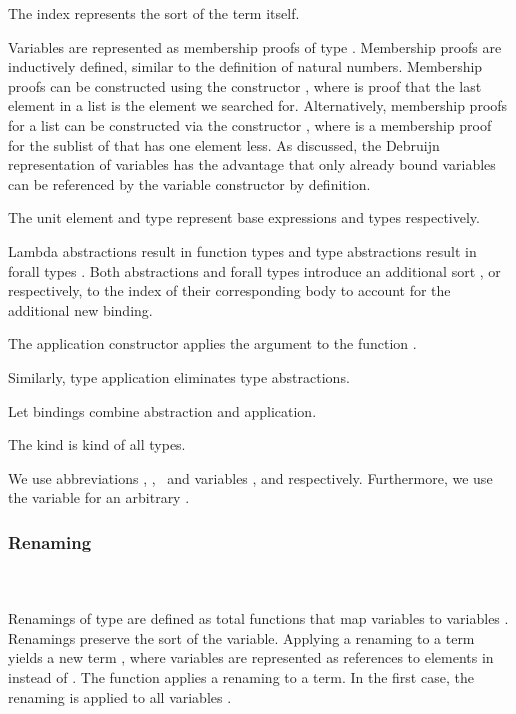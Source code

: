 \noindent The index  represents the sort of the term itself.

\FTerm
Variables   are represented as membership proofs of type   .
Membership proofs are inductively defined, similar to the definition of natural numbers. 
Membership proofs can be constructed using the constructor , where  is proof that the last element in a list  is the element we searched for. 
Alternatively, membership proofs for a list  can be constructed via the constructor  , where  is a membership proof for the sublist  of  that has one element less. 
As discussed, the Debruijn representation of variables has the advantage that only already bound variables can be referenced by the variable constructor by definition. 

\noindent The unit element  and type  represent base expressions and types respectively. 

\noindent Lambda abstractions   result in function types    and type abstractions   result in forall types  . 
Both abstractions and forall types introduce an additional sort , or  respectively, to the index  of their corresponding body to account for the additional new binding.

\noindent The application constructor    applies the argument  to the function .

\noindent Similarly, type application    eliminates type abstractions. 

\noindent Let bindings     combine abstraction and application. 

\noindent The kind  is kind of all types.

\noindent We use abbreviations \FVar, \FExpr, \FType\ and variables ,  and  respectively. Furthermore, we use the variable  for an arbitrary   .

\subsubsection{Renaming}\hfill\\\\
Renamings  of type    are defined as total functions that map variables    to variables   . 
Renamings preserve the sort  of the variable.
\FRen
Applying a renaming    to a term    yields a new term   , where variables are represented as references to elements in  instead of . The function  applies a renaming to a term.
\Fren
In the first case, the renaming is applied to all variables .

